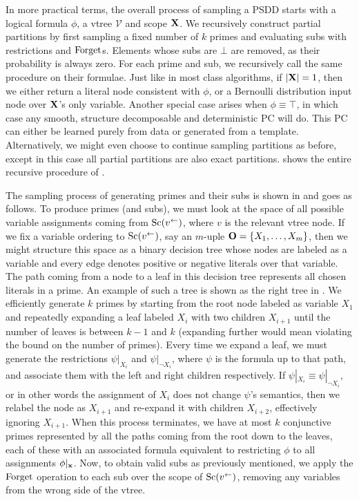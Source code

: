 In more practical terms, the overall process of sampling a PSDD starts with a logical formula
$\phi$, a vtree $\mathcal{V}$ and scope $\mathbf{X}$. We recursively construct partial partitions by
first sampling a fixed number of $k$ primes and evaluating subs with restrictions and $\operatorname{\normalfont{Forget}}$s.
Elements whose subs are $\bot$ are removed, as their probability is always zero. For each prime and sub, we
recursively call the same procedure on their formulae. Just like in most \divclass{} class
algorithms, if $|\mathbf{X}|=1$, then we either return a literal node consistent with $\phi$, or a
Bernoulli distribution input node over $\mathbf{X}$'s only variable. Another special case arises when
$\phi\equiv\top$, in which case any smooth, structure decomposable and deterministic PC will do.
This PC can either be learned purely from data or generated from a template. Alternatively, we
might even choose to continue sampling partitions as before, except in this case all partial
partitions are also exact partitions.  shows the entire recursive procedure
of .

The sampling process of generating primes and their subs is shown in  and
goes as follows. To produce primes (and subs), we must look at the space of all possible variable
assignments coming from $\operatorname*{\normalfont{Sc}}(v^\gets)$, where $v$ is the relevant vtree node. If we fix a variable
ordering to $\operatorname*{\normalfont{Sc}}(v^\gets)$, say an $m$-uple $\mathbf{O}=\{ X_1,\ldots,X_m\}$, then we might structure
this space as a binary decision tree whose nodes are labeled as a variable and every edge denotes
positive or negative literals over that variable. The path coming from a node to a leaf in this
decision tree represents all chosen literals in a prime. An example of such a tree is shown as the
right tree in . We efficiently generate $k$ primes by starting from the root
node labeled as variable $X_1$ and repeatedly expanding a leaf labeled $X_i$ with two children
$X_{i+1}$ until the number of leaves is between $k-1$ and $k$ (expanding further would mean
violating the bound on the number of primes). Every time we expand a leaf, we must generate the
restrictions $\psi|_{X_i}$ and $\psi|_{\neg X_i}$, where $\psi$ is the formula up to that path, and
associate them with the left and right children respectively. If $\psi|_{X_i}\equiv\psi|_{\neg
X_i}$, or in other words the assignment of $X_i$ does not change $\psi$'s semantics, then we
relabel the node as $X_{i+1}$ and re-expand it with children $X_{i+2}$, effectively ignoring
$X_{i+1}$. When this process terminates, we have at most $k$ conjunctive primes represented by all
the paths coming from the root down to the leaves, each of these with an associated formula
equivalent to restricting $\phi$ to all assignments $\phi|_{\mathbf{x}}$. Now, to obtain valid subs as
previously mentioned, we apply the $\operatorname{\normalfont{Forget}}$ operation to each sub over the scope of
$\operatorname*{\normalfont{Sc}}(v^\gets)$, removing any variables from the wrong side of the vtree.

